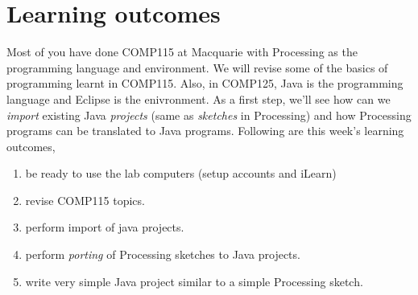 \section*{Learning outcomes}
Most of you have done COMP115 at Macquarie with Processing as the programming language and environment. We will revise some of the basics of programming learnt in COMP115. Also, in COMP125, Java is the programming language and Eclipse is the enivronment. As a first step, we'll see how can we \emph{import} existing Java \emph{projects} (same as \emph{sketches} in Processing) and how Processing programs can be translated to Java programs. Following are this week's learning outcomes,
\begin{enumerate}
\item be ready to use the lab computers (setup accounts and iLearn)
\item revise COMP115 topics.
\item perform import of java projects.
\item perform \emph{porting} of Processing sketches to Java projects.
\item write very simple Java project similar to a simple Processing sketch.
\end{enumerate}

